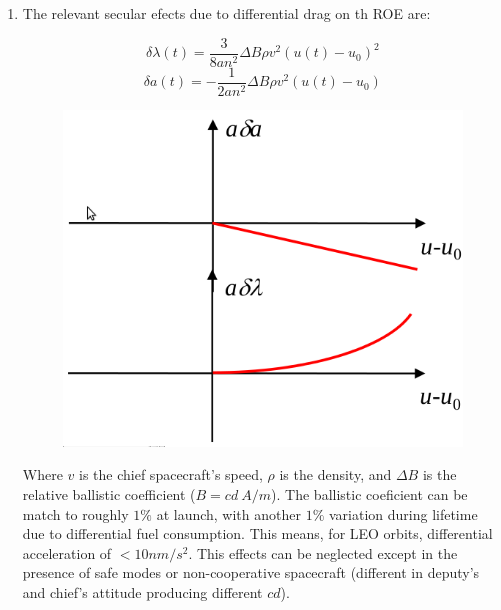 \documentclass[a4paper]{article}
\begin{document}
\begin{enumerate}[label=\emph{\alph*)}]
  \item %
    The relevant secular efects due to differential drag on th ROE are:
    \begin{figure}[h]
      \begin{minipage}{0.5\textwidth}
	\[ \delta \lambda(t) = \frac{3}{8an^2} \Delta B \rho v^2 (u(t)-u_0)^2\]
	\[ \delta a(t) = -\frac{1}{2an^2}\Delta B \rho v^2(u(t)-u_0)\]
      \end{minipage}
      \begin{minipage}{0.5\textwidth}
         \centering
         \includegraphics[width=\textwidth]{secular_drag_effects}
      \end{minipage}
    \end{figure}
    Where $v$ is the chief spacecraft's speed, $\rho$ is the density, and $\Delta B$ is the relative ballistic coefficient ($B = cd~ A/m$). The ballistic coeficient can be match to roughly $1\%$ at launch, with another $1\%$ variation during lifetime due to differential fuel consumption. This means, for LEO orbits, differential acceleration of $<10 nm/s^2$. This effects can be neglected except in the presence of safe modes or non-cooperative spacecraft (different in deputy's and chief's attitude producing different $cd$).



\end{enumerate}
\end{document}
